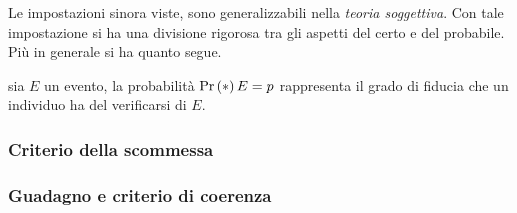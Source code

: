 \documentclass{subfiles}
\begin{document}
Le impostazioni sinora viste, sono generalizzabili nella \emph{teoria soggettiva}.
Con tale impostazione si ha una divisione rigorosa tra gli aspetti del certo e del probabile.
Più in generale si ha quanto segue.
\begin{Definition*}
    sia \(E\) un evento, la probabilità \(\Prob*{E} = p\) rappresenta il grado di fiducia che un individuo ha del verificarsi di \(E\).
\end{Definition*}

\subsubsection{Criterio della scommessa}


\subsubsection{Guadagno e criterio di coerenza}

\end{document}

